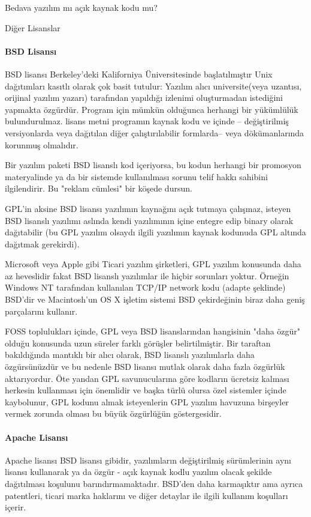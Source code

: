 \begin{section}{Bedava yazılım mı açık kaynak kodu mu?}
\begin{subsection}{Diğer Lisanslar}
\paragraph{BSD Lisansı}{BSD lisansı Berkeley'deki Kaliforniya Üniversitesinde başlatılmıştır Unix dağıtımları kasıtlı olarak çok basit tutulur: Yazılım alıcı universite(veya uzantısı, orijinal yazılım yazarı) tarafından yapıldığı izlenimi oluşturmadan istediğini yapmakta özgürdür. Program için mümkün olduğunca herhangi bir yükümlülük bulundurulmaz. lisans metni programın kaynak kodu ve içinde -- değiştirilmiş versiyonlarda veya dağıtılan diğer çalıştırılabilir formlarda-- veya dökümanlarında korunmuş olmalıdır.}

Bir yazılım paketi BSD lisanslı kod içeriyorsa, bu kodun herhangi bir promosyon materyalinde ya da bir sistemde kullanılması sorunu  telif hakkı sahibini ilgilendirir. Bu "reklam cümlesi" bir köşede dursun.

GPL'in aksine BSD lisansı yazılımın kaynağını açık tutmaya çalışmaz, isteyen  BSD lisanslı yazılımı aslında kendi yazılımının içine entegre edip binary olarak dağıtabilir (bu GPL yazılım olsaydı ilgili yazılımın kaynak kodunuda GPL altında dağıtmak gerekirdi).

Microsoft veya Apple gibi Ticari yazılım şirketleri, GPL yazılım konusunda daha az heveslidir fakat BSD lisanslı yazılımlar  ile hiçbir sorunları yoktur. Örneğin Windows NT tarafından kullanılan TCP/IP network kodu (adapte şeklinde) BSD'dir ve Macintosh'un OS X işletim sistemi BSD çekirdeğinin biraz daha geniş parçalarını kullanır.

FOSS toplulukları içinde, GPL veya BSD lisanslarından hangisinin "daha özgür" olduğu konusunda uzun süreler farklı görüşler belirtilmiştir. Bir taraftan bakıldığında mantıklı bir alıcı olarak, BSD lisanslı yazılımlarla daha özgürsünüzdür ve bu nedenle BSD lisansı mutlak olarak daha fazla özgürlük aktarıyordur. Öte yandan GPL savunucularına göre kodların ücretsiz kalması herkesin kullanması için önemlidir ve başka türlü olursa özel sistemler içinde kaybolunur, GPL kodunu almak isteyenlerin GPL yazılım havuzuna birşeyler vermek zorunda olması bu büyük özgürlüğün göstergesidir.

\paragraph{Apache Lisansı}{Apache lisansı BSD lisansı gibidir, yazılımların değiştirilmiş sürümlerinin aynı lisansı kullanarak ya da özgür - açık kaynak kodlu yazılım olacak şekilde dağıtılması koşulunu barındırmamaktadır. BSD'den daha karmaşıktır ama ayrıca patentleri, ticari marka haklarını ve diğer detaylar ile ilgili kullanım koşulları içerir.}

\end{subsection}
\end{section}
